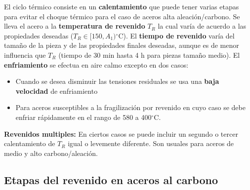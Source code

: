 \documentclass{article}
\newcommand{\Aone}{A\ensuremath{_{1}}}
\newcommand{\grad}{\ensuremath{^\circ \mathrm{C}}}
\begin{document}
El ciclo térmico consiste en un \textbf{calentamiento} que puede tener varias etapas para evitar el choque térmico para el caso de aceros alta aleación/carbono. Se lleva el acero a la \textbf{temperatura de revenido} $T_R$ la cual varía de acuerdo a las propiedades deseadas ($T_R\in [150, \Aone )$\grad{}).  El \textbf{tiempo de revenido} varía del tamaño de la pieza y de las propiedades finales deseadas, aunque es de menor influencia que $T_R$ (tiempo de 30 min hasta 4 h para piezas tamaño medio). El \textbf{enfriamiento} se efectua en aire calmo excepto en dos casos: 
\begin{itemize}
    \item Cuando se desea disminuir las tensiones residuales se usa una \textbf{baja velocidad} de enfriamiento
    \item Para aceros susceptibles a la fragilización por revenido en cuyo caso se debe enfriar rápidamente en el rango de 580 a 400\grad.
\end{itemize}
\textbf{Revenidos multiples:} En ciertos casos se puede incluir un segundo o tercer calentamiento de $T_R$ igual o levemente diferente. Son usuales para aceros de medio y alto carbono/aleación.

\subsection{Etapas del revenido en aceros al carbono}
\end{document}
